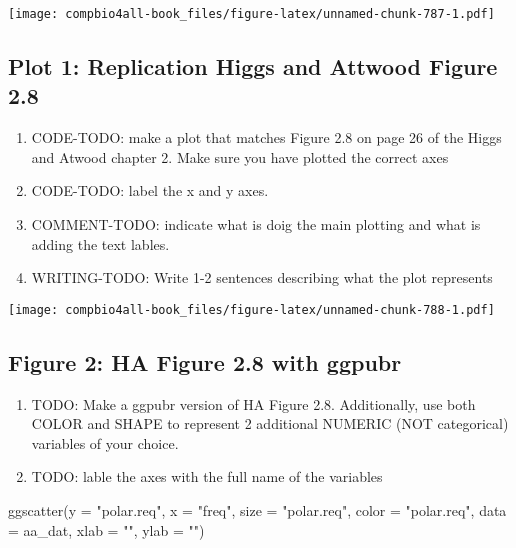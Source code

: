 \documentclass[
]{book}
\newenvironment{Shaded}{\begin{snugshade}}{\end{snugshade}}
\newcommand{\AttributeTok}[1]{\textcolor[rgb]{0.77,0.63,0.00}{#1}}
\newcommand{\FunctionTok}[1]{\textcolor[rgb]{0.00,0.00,0.00}{#1}}
\newcommand{\NormalTok}[1]{#1}
\newcommand{\StringTok}[1]{\textcolor[rgb]{0.31,0.60,0.02}{#1}}
\providecommand{\tightlist}{%
  \setlength{\itemsep}{0pt}\setlength{\parskip}{0pt}}
\begin{document}
\texttt{[image: compbio4all-book\_files/figure-latex/unnamed-chunk-787-1.pdf]}

\hypertarget{plot-1-replication-higgs-and-attwood-figure-2.8-1}{%
\subsection{Plot 1: Replication Higgs and Attwood Figure 2.8}\label{plot-1-replication-higgs-and-attwood-figure-2.8-1}}

\begin{enumerate}
\def\labelenumi{\arabic{enumi}.}
\tightlist
\item
  CODE-TODO: make a plot that matches Figure 2.8 on page 26 of the Higgs and Atwood chapter 2. Make sure you have plotted the correct axes
\item
  CODE-TODO: label the x and y axes.
\item
  COMMENT-TODO: indicate what is doig the main plotting and what is adding the text lables.
\item
  WRITING-TODO: Write 1-2 sentences describing what the plot represents
\end{enumerate}

\texttt{[image: compbio4all-book\_files/figure-latex/unnamed-chunk-788-1.pdf]}

\hypertarget{figure-2-ha-figure-2.8-with-ggpubr-1}{%
\subsection{Figure 2: HA Figure 2.8 with ggpubr}\label{figure-2-ha-figure-2.8-with-ggpubr-1}}

\begin{enumerate}
\def\labelenumi{\arabic{enumi}.}
\tightlist
\item
  TODO: Make a ggpubr version of HA Figure 2.8. Additionally, use both COLOR and SHAPE to represent 2 additional NUMERIC (NOT categorical) variables of your choice.
\item
  TODO: lable the axes with the full name of the variables
\end{enumerate}

\begin{Shaded}
\begin{Highlighting}[]
\FunctionTok{ggscatter}\NormalTok{(}\AttributeTok{y =} \StringTok{"polar.req"}\NormalTok{,}
          \AttributeTok{x =} \StringTok{"freq"}\NormalTok{,}
          \AttributeTok{size =} \StringTok{"polar.req"}\NormalTok{,}
          \AttributeTok{color =} \StringTok{"polar.req"}\NormalTok{,}
          \AttributeTok{data =}\NormalTok{ aa\_dat,}
          \AttributeTok{xlab =} \StringTok{""}\NormalTok{,}
          \AttributeTok{ylab =} \StringTok{""}\NormalTok{)}
\end{Highlighting}
\end{Shaded}
\end{document}
